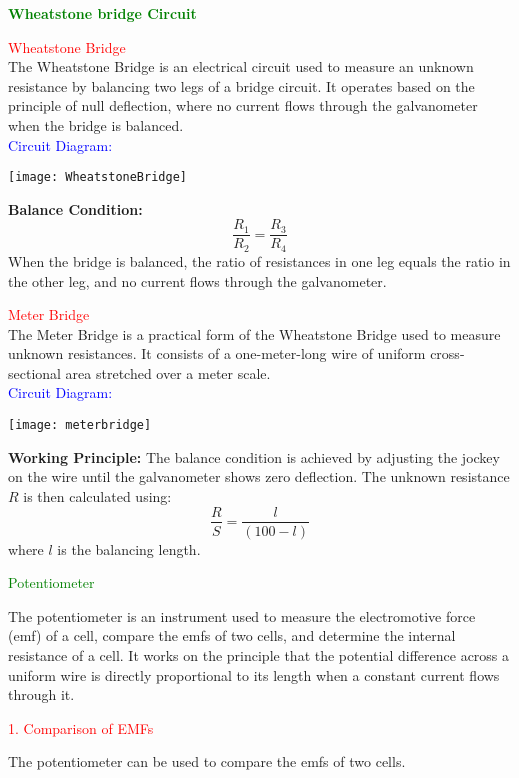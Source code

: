 \documentclass{beamer}
\begin{document}
\begin{frame}
\textcolor{green}{\textbf{Wheatstone bridge Circuit}}


\textcolor{red}{Wheatstone Bridge}\\

The Wheatstone Bridge is an electrical circuit used to measure an unknown resistance by balancing two legs of a bridge circuit. It operates based on the principle of null deflection, where no current flows through the galvanometer when the bridge is balanced.\\

\textcolor{blue}{Circuit Diagram:}
\begin{center}
\texttt{[image: WheatstoneBridge]}
\end{center}


\end{frame}

\begin{frame}


\textbf{Balance Condition:}
\[
\frac{R_1}{R_2} = \frac{R_3}{R_4}
\]
When the bridge is balanced, the ratio of resistances in one leg equals the ratio in the other leg, and no current flows through the galvanometer.

\vspace{0.5cm}

\textcolor{red}{Meter Bridge}\\

The Meter Bridge is a practical form of the Wheatstone Bridge used to measure unknown resistances. It consists of a one-meter-long wire of uniform cross-sectional area stretched over a meter scale.\\

\textcolor{blue}{Circuit Diagram:}
\begin{center}
\texttt{[image: meterbridge]}
\end{center}
\end{frame}

\begin{frame}
\textbf{Working Principle:}  
The balance condition is achieved by adjusting the jockey on the wire until the galvanometer shows zero deflection. The unknown resistance \(R\) is then calculated using:
\[
\frac{R}{S} = \frac{l}{(100 - l)}
\]
where \(l\) is the balancing length.




\textcolor{green}{Potentiometer}

The potentiometer is an instrument used to measure the electromotive force (emf) of a cell, compare the emfs of two cells, and determine the internal resistance of a cell. It works on the principle that the potential difference across a uniform wire is directly proportional to its length when a constant current flows through it.

\textcolor{red}{1. Comparison of EMFs}

The potentiometer can be used to compare the emfs of two cells.

\end{frame}
\end{document}
